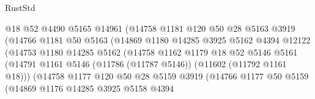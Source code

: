 \begin{lexlean}{RustStd}
\begin{coremodule}
                                @18
                                @52
                                @4490
                                @5165
                                @14961
                                (@14758
                                  @1181
                                  @120
                                  @50
                                  @28
                                  @5163
                                  @3919
                                  (@14766
                                    @1181
                                    @50
                                    @5163
                                    (@14869
                                      @1180
                                      @14285
                                      @3925
                                      @5162
                                      @4394
                                      @12122
                                      (@14753
                                        @1180
                                        @14285
                                        @5162
                                        (@14758
                                          @1162
                                          @1179
                                          @18
                                          @52
                                          @5146
                                          @5161
                                          (@14791
                                            @1161
                                            @5146
                                            (@11786 (@11787 @5146))
                                            (@11602 (@11792 @1161 @18)))
                                          (@14758
                                            @1177
                                            @120
                                            @50
                                            @28
                                            @5159
                                            @3919
                                            (@14766
                                              @1177
                                              @50
                                              @5159
                                              (@14869
                                                @1176
                                                @14285
                                                @3925
                                                @5158
                                                @4394

\end{coremodule}
\end{lexlean}

